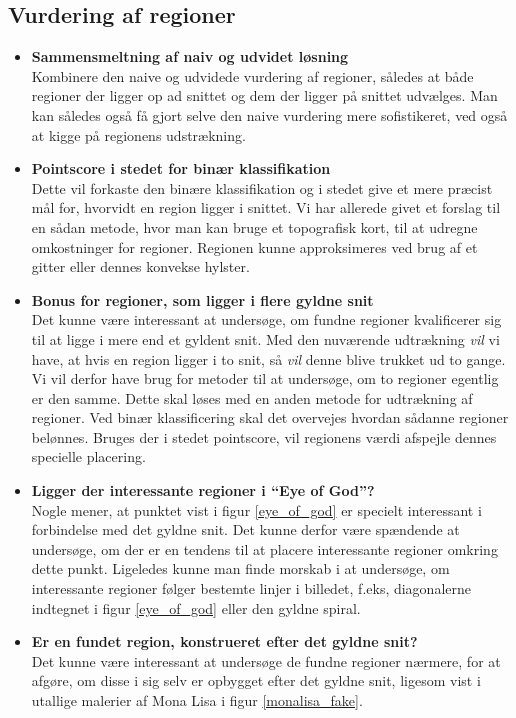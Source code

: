 {\subsection{Vurdering af regioner}
\begin{itemize}
    \item \textbf{Sammensmeltning af naiv og udvidet løsning}\\
        Kombinere den naive og udvidede vurdering af regioner, således
        at både regioner der ligger op ad snittet og dem der ligger på
        snittet udvælges. Man kan således også få gjort selve den naive
        vurdering mere sofistikeret, ved også at kigge på regionens
        udstrækning.
    \item \textbf{Pointscore i stedet for binær klassifikation}\\
        Dette vil forkaste den binære klassifikation og i stedet give et
        mere præcist mål for, hvorvidt en region ligger i snittet.  Vi
        har allerede givet et forslag til en sådan metode, hvor man kan
        bruge et topografisk kort, til at udregne omkostninger for
        regioner.  Regionen kunne approksimeres ved brug af et gitter
        eller dennes konvekse hylster.
    \item \textbf{Bonus for regioner, som ligger i flere gyldne snit}\\
        Det kunne være interessant at undersøge, om fundne regioner
        kvalificerer sig til at ligge i mere end et gyldent snit. Med
        den nuværende udtrækning \emph{vil} vi have, at hvis en region
        ligger i to snit, så \emph{vil} denne blive trukket ud to gange.
        Vi vil derfor have brug for metoder til at undersøge, om to
        regioner egentlig er den samme. Dette skal løses med en anden
        metode for udtrækning af regioner. Ved binær klassificering skal
        det overvejes hvordan sådanne regioner belønnes. Bruges der i
        stedet pointscore, vil regionens værdi afspejle dennes specielle
        placering.
    \item \textbf{Ligger der interessante regioner i ``Eye of God''?}\\
        Nogle mener, at punktet vist i figur \ref{eye_of_god} er
        specielt interessant i forbindelse med det gyldne snit. Det
        kunne derfor være spændende at undersøge, om der er en tendens
        til at placere interessante regioner omkring dette punkt.
        Ligeledes kunne man finde morskab i at undersøge, om
        interessante regioner følger bestemte linjer i billedet, f.eks,
        diagonalerne indtegnet i figur \ref{eye_of_god} eller den gyldne
        spiral.
    \item \textbf{Er en fundet region, konstrueret efter det gyldne snit?}\\
        Det kunne være interessant at undersøge de fundne regioner
        nærmere, for at afgøre, om disse i sig selv er opbygget efter
        det gyldne snit, ligesom vist i utallige malerier af Mona Lisa i
        figur \ref{monalisa_fake}.
\end{itemize}


}
